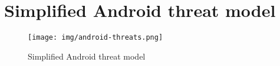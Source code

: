 \section{Simplified Android threat model}
\label{section:andro-threat}

\begin{figure*}
\centering
\texttt{[image: img/android-threats.png]}
\caption{Simplified Android threat model}
\label{pic:andro-threat}
\end{figure*}
